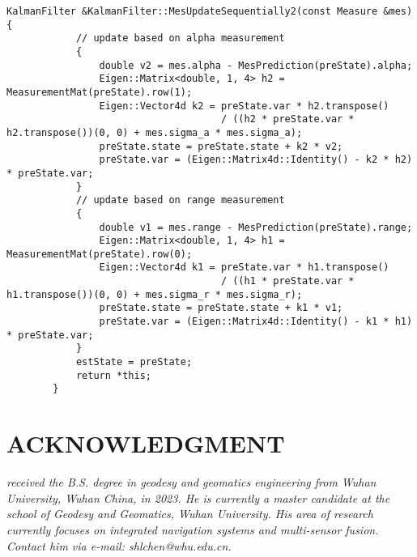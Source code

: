 \documentclass[12pt, onecolumn]{article}
\newcommand\normf{\fangsong}
\begin{document}
	\begin{lstlisting}[caption={\normf “逐次量测更新(先角度后距离)”算法实现}]
	    KalmanFilter &KalmanFilter::MesUpdateSequentially2(const Measure &mes) {
	        // update based on alpha measurement
	        {
	            double v2 = mes.alpha - MesPrediction(preState).alpha;
	            Eigen::Matrix<double, 1, 4> h2 = MeasurementMat(preState).row(1);
	            Eigen::Vector4d k2 = preState.var * h2.transpose()
	                                 / ((h2 * preState.var * h2.transpose())(0, 0) + mes.sigma_a * mes.sigma_a);
	            preState.state = preState.state + k2 * v2;
	            preState.var = (Eigen::Matrix4d::Identity() - k2 * h2) * preState.var;
	        }
	        // update based on range measurement
	        {
	            double v1 = mes.range - MesPrediction(preState).range;
	            Eigen::Matrix<double, 1, 4> h1 = MeasurementMat(preState).row(0);
	            Eigen::Vector4d k1 = preState.var * h1.transpose()
	                                 / ((h1 * preState.var * h1.transpose())(0, 0) + mes.sigma_r * mes.sigma_r);
	            preState.state = preState.state + k1 * v1;
	            preState.var = (Eigen::Matrix4d::Identity() - k1 * h1) * preState.var;
	        }
	        estState = preState;
	        return *this;
	    }
	\end{lstlisting}
		
	\newpage
	\section{ACKNOWLEDGMENT}
	\begin{tcolorbox}[colback=white,colframe=white!70!black,title={\bfseries Author Information}]
	\par\noindent
		\parbox[t]{\linewidth}{
	 \noindent{}
	 \emph{
	 received the B.S. degree in geodesy and geomatics engineering from Wuhan University, Wuhan China, in 2023.
	 He is currently a master candidate at the school of Geodesy and Geomatics, Wuhan University. His area of research currently focuses on integrated navigation systems and multi-sensor fusion.
	 Contact him via e-mail: shlchen@whu.edu.cn.
	 }}
	\end{tcolorbox}
		
		
\end{document}
